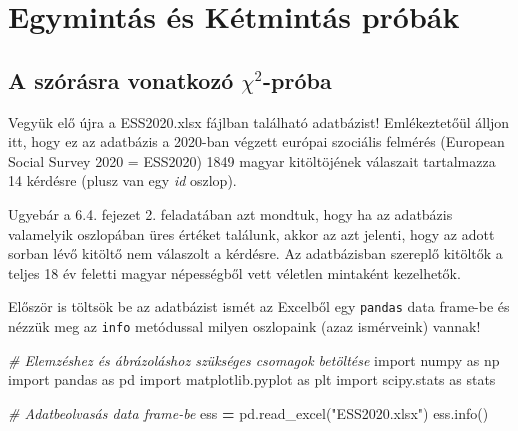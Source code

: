 \documentclass[
]{book}
\newenvironment{Shaded}{\begin{snugshade}}{\end{snugshade}}
\newcommand{\CommentTok}[1]{\textcolor[rgb]{0.56,0.35,0.01}{\textit{#1}}}
\newcommand{\ImportTok}[1]{#1}
\newcommand{\NormalTok}[1]{#1}
\newcommand{\OperatorTok}[1]{\textcolor[rgb]{0.81,0.36,0.00}{\textbf{#1}}}
\newcommand{\StringTok}[1]{\textcolor[rgb]{0.31,0.60,0.02}{#1}}
\begin{document}
\chapter{Egymintás és Kétmintás próbák}\label{egymintuxe1s-uxe9s-kuxe9tmintuxe1s-pruxf3buxe1k}

\section{\texorpdfstring{A szórásra vonatkozó \(\chi^2\)-próba}{A szórásra vonatkozó \textbackslash chi\^{}2-próba}}\label{a-szuxf3ruxe1sra-vonatkozuxf3-chi2-pruxf3ba}

Vegyük elő újra a ESS2020.xlsx fájlban található adatbázist! Emlékeztetőül álljon itt, hogy ez az adatbázis a 2020-ban végzett európai szociális felmérés (European Social Survey 2020 = ESS2020) 1849 magyar kitöltöjének válaszait tartalmazza 14 kérdésre (plusz van egy \emph{id} oszlop).

Ugyebár a 6.4. fejezet 2. feladatában azt mondtuk, hogy ha az adatbázis valamelyik oszlopában üres értéket találunk, akkor az azt jelenti, hogy az adott sorban lévő kitöltő nem válaszolt a kérdésre. Az adatbázisban szereplő kitöltők a teljes 18 év feletti magyar népességből vett véletlen mintaként kezelhetők.

Először is töltsök be az adatbázist ismét az Excelből egy \texttt{pandas} data frame-be és nézzük meg az \texttt{info} metódussal milyen oszlopaink (azaz ismérveink) vannak!

\begin{Shaded}
\begin{Highlighting}[]
\CommentTok{\# Elemzéshez és ábrázoláshoz szükséges csomagok betöltése}
\ImportTok{import}\NormalTok{ numpy }\ImportTok{as}\NormalTok{ np}
\ImportTok{import}\NormalTok{ pandas }\ImportTok{as}\NormalTok{ pd}
\ImportTok{import}\NormalTok{ matplotlib.pyplot }\ImportTok{as}\NormalTok{ plt}
\ImportTok{import}\NormalTok{ scipy.stats }\ImportTok{as}\NormalTok{ stats}

\CommentTok{\# Adatbeolvasás data frame{-}be}
\NormalTok{ess }\OperatorTok{=}\NormalTok{ pd.read\_excel(}\StringTok{"ESS2020.xlsx"}\NormalTok{)}
\NormalTok{ess.info()}
\end{Highlighting}
\end{Shaded}
\end{document}
